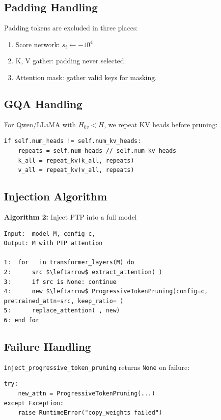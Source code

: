 \subsection{Padding Handling}

Padding tokens are excluded in three places:
\begin{enumerate}
\item Score network: $s_i \leftarrow -10^4$.
\item K, V gather: padding never selected.
\item Attention mask: gather valid keys for masking.

\end{enumerate}
\subsection{GQA Handling}

For Qwen/LLaMA with $H_{kv} < H$, we repeat KV heads before pruning:

\begin{lstlisting}
if self.num_heads != self.num_kv_heads:
    repeats = self.num_heads // self.num_kv_heads
    k_all = repeat_kv(k_all, repeats)
    v_all = repeat_kv(v_all, repeats)
\end{lstlisting}

\subsection{Injection Algorithm}

\textbf{Algorithm 2:} Inject PTP into a full model
\begin{lstlisting}
Input:  model M, config c,  
Output: M with PTP attention

1:  for   in transformer_layers(M) do
2:      src $\leftarrow$ extract_attention( )
3:      if src is None: continue
4:      new $\leftarrow$ ProgressiveTokenPruning(config=c, pretrained_attn=src, keep_ratio= )
5:      replace_attention( , new)
6: end for
\end{lstlisting}

\subsection{Failure Handling}

\texttt{inject\_progressive\_token\_pruning} returns \texttt{None} on failure:

\begin{lstlisting}
try:
    new_attn = ProgressiveTokenPruning(...)
except Exception:
    raise RuntimeError("copy_weights failed")
\end{lstlisting}

